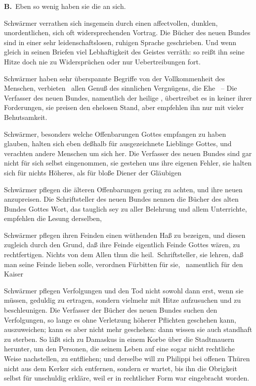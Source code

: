 \begin{aufza}
\vabst \textbf{B.}~Eben so wenig haben sie die  an sich.
\begin{aufzb}
\item Schwärmer verrathen sich insgemein durch einen affectvollen, dunklen, unordentlichen, sich oft widersprechenden Vortrag. Die Bücher des neuen Bundes sind in einer sehr leidenschaftslosen, ruhigen Sprache geschrieben. Und wenn gleich  in seinen Briefen viel Lebhaftigkeit des Geistes verräth: so reißt ihn seine Hitze doch nie zu Widersprüchen oder nur Uebertreibungen fort.
\item Schwärmer haben sehr überspannte Begriffe von der Vollkommenheit des Menschen, verbieten \zB\ allen Genuß des sinnlichen Vergnügens, die Ehe \udgl\  -- Die Verfasser des neuen Bundes, namentlich der heilige , übertreibet es in keiner ihrer Forderungen, sie preisen den ehelosen Stand, aber empfehlen ihn nur mit vieler Behutsamkeit.
\item Schwärmer, besonders welche Offenbarungen Gottes empfangen zu haben glauben, halten sich eben deßhalb für ausgezeichnete Lieblinge Gottes, und verachten andere Menschen um sich her. Die Verfasser des neuen Bundes sind gar nicht für sich selbst eingenommen, sie gestehen uns ihre eigenen Fehler, sie halten sich für nichts Höheres, als für bloße Diener der Gläubigen \usw
\item Schwärmer pflegen die älteren Offenbarungen gering zu achten, und ihre neuen anzupreisen. Die Schriftsteller des neuen Bundes nennen die Bücher des alten Bundes Gottes Wort, das tauglich sey zu aller Belehrung und allem Unterrichte, empfehlen die Lesung derselben, \usw
\item Schwärmer pflegen ihren Feinden einen wüthenden Haß zu bezeigen, und diesen zugleich durch den Grund, daß ihre Feinde eigentlich Feinde Gottes wären, zu rechtfertigen. Nichts von dem Allen thun die heil.\ Schriftsteller, sie lehren, daß man seine Feinde lieben solle, verordnen Fürbitten für sie, \zB\ namentlich für den Kaiser \usw
\item Schwärmer pflegen Verfolgungen und den Tod nicht sowohl dann erst, wenn sie müssen, geduldig zu ertragen, sondern vielmehr mit Hitze aufzusuchen und zu beschleunigen. Die Verfasser der Bücher des neuen Bundes suchen den Verfolgungen, so lange es ohne Verletzung höherer Pflichten geschehen kann, auszuweichen; kann es aber nicht mehr geschehen: dann wissen sie auch standhaft zu sterben. So läßt sich  zu Damaskus in einem Korbe über die Stadtmauern herunter, um den Personen, die seinem Leben auf eine sogar nicht rechtliche Weise nachstellen, zu entfliehen; und derselbe  will zu Philippi bei offenen Thüren nicht aus dem Kerker sich entfernen, sondern er wartet, bis ihn die Obrigkeit selbst für unschuldig erkläre, weil er in rechtlicher Form war eingebracht worden.
\end{aufzb}
\end{aufza}\par
